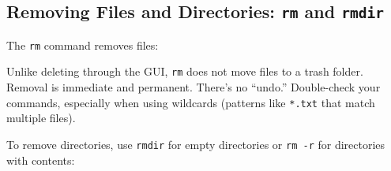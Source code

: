 \documentclass[
  letterpaper,
  DIV=11,
  numbers=noendperiod]{scrreprt}
\newenvironment{Shaded}{\begin{snugshade}}{\end{snugshade}}
\newcommand{\AttributeTok}[1]{\textcolor[rgb]{0.40,0.45,0.13}{#1}}
\newcommand{\CommentTok}[1]{\textcolor[rgb]{0.37,0.37,0.37}{#1}}
\newcommand{\ExtensionTok}[1]{\textcolor[rgb]{0.00,0.23,0.31}{#1}}
\newcommand{\NormalTok}[1]{\textcolor[rgb]{0.00,0.23,0.31}{#1}}
\begin{document}
\subsection{\texorpdfstring{Removing Files and Directories: \texttt{rm}
and
\texttt{rmdir}}{Removing Files and Directories: rm and rmdir}}\label{removing-files-and-directories-rm-and-rmdir}

The \texttt{rm} command removes files:

\begin{codelisting}

\caption{\texttt{terminal}}

\begin{Shaded}
\end{Shaded}

\end{codelisting}

\begin{tcolorbox}[enhanced jigsaw, opacitybacktitle=0.6, arc=.35mm, colback=white, bottomtitle=1mm, opacityback=0, toprule=.15mm, left=2mm, colbacktitle=quarto-callout-warning-color!10!white, breakable, coltitle=black, toptitle=1mm, colframe=quarto-callout-warning-color-frame, bottomrule=.15mm, titlerule=0mm, title=\textcolor{quarto-callout-warning-color}{\faExclamationTriangle}\hspace{0.5em}{There Is No Recycle Bin}, rightrule=.15mm, leftrule=.75mm]

Unlike deleting through the GUI, \texttt{rm} does not move files to a
trash folder. Removal is immediate and permanent. There's no ``undo.''
Double-check your commands, especially when using wildcards (patterns
like \texttt{*.txt} that match multiple files).

\end{tcolorbox}

To remove directories, use \texttt{rmdir} for empty directories or
\texttt{rm\ -r} for directories with contents:

\begin{codelisting}

\caption{\texttt{terminal}}

\begin{Shaded}
\end{Shaded}

\end{codelisting}
\end{document}
